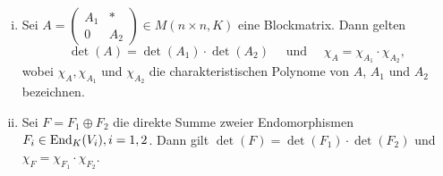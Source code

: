 \begin{lemma}
	\label{lemma:9.8}
	\begin{enumerate}[(i)]
		\item Sei $A = \begin{pmatrix}
		A_1 & * \\
		0 & A_2
		\end{pmatrix} \in M(n \times n, K)$ eine Blockmatrix.
		Dann gelten
		\[
			\det(A) = \det(A_1) \cdot \det(A_2) \quad \text{ und } \quad \chi_A = \chi_{A_1} \cdot \chi_{A_2},
		\]
		wobei $\chi_A, \chi_{A_1}$ und $\chi_{A_2}$ die charakteristischen Polynome von $A$, $A_1$ und $A_2$ bezeichnen.
		\item Sei $F = F_1 \oplus F_2$ die direkte Summe zweier Endomorphismen $F_i \in \operatorname{End}_K(V_i), i=1,2$.
		Dann gilt $\det(F) = \det(F_1) \cdot \det(F_2)$ und $\chi_F = \chi_{F_1} \cdot \chi_{F_2}$.
	\end{enumerate}
\end{lemma}

